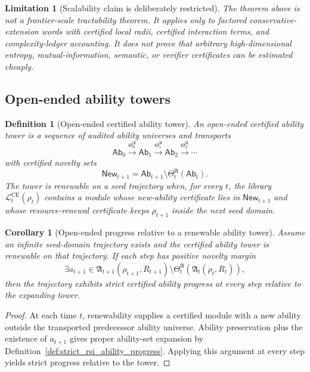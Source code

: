 \documentclass[11pt]{article}
\newtheorem{corollary}[theorem]{Corollary}
\newtheorem{definition}[theorem]{Definition}
\newtheorem{limitation}[theorem]{Limitation}
\newcommand{\Lcal}{\mathcal{L}}
\newcommand{\1}{\mathbf{1}}
\begin{document}
\begin{limitation}[Scalability claim is deliberately restricted]
The theorem above is not a frontier-scale tractability theorem.  It applies only to factored conservative-extension words with certified local radii, certified interaction terms, and complexity-ledger accounting.  It does not prove that arbitrary high-dimensional entropy, mutual-information, semantic, or verifier certificates can be estimated cheaply.
\end{limitation}

\subsection{Open-ended ability towers}

\begin{definition}[Open-ended certified ability tower]
\label{def:batch11_open_ended_ability_tower}
An open-ended certified ability tower is a sequence of audited ability universes and transports
\[
\mathsf{Ab}_0
\xrightarrow{\Theta_0^{\mathfrak A}}
\mathsf{Ab}_1
\xrightarrow{\Theta_1^{\mathfrak A}}
\mathsf{Ab}_2
\xrightarrow{\Theta_2^{\mathfrak A}}
\cdots
\]
with certified novelty sets
\[
\mathsf{New}_{t+1}
=
\mathsf{Ab}_{t+1}\setminus\Theta_t^{\mathfrak A}(\mathsf{Ab}_t).
\]
The tower is renewable on a seed trajectory when, for every \(t\), the library \(\Lcal_t^{\mathrm{CE}}(\rho_t)\) contains a module whose new-ability certificate lies in \(\mathsf{New}_{t+1}\) and whose resource-renewal certificate keeps \(\rho_{t+1}\) inside the next seed domain.
\end{definition}

\begin{corollary}[Open-ended progress relative to a renewable ability tower]
\label{cor:batch11_open_ended_progress_relative_to_tower}
Assume an infinite seed-domain trajectory exists and the certified ability tower is renewable on that trajectory.  If each step has positive novelty margin
\[
\exists a_{t+1}\in
\mathfrak A_{t+1}(\rho_{t+1},R_{t+1})
\setminus
\Theta_t^{\mathfrak A}(\mathfrak A_t(\rho_t,R_t)),
\]
then the trajectory exhibits strict certified ability progress at every step relative to the expanding tower.
\end{corollary}

\begin{proof}
At each time \(t\), renewability supplies a certified module with a new ability outside the transported predecessor ability universe.  Ability preservation plus the existence of \(a_{t+1}\) gives proper ability-set expansion by Definition~\ref{def:strict_rsi_ability_progress}.  Applying this argument at every step yields strict progress relative to the tower.
\end{proof}
\end{document}
